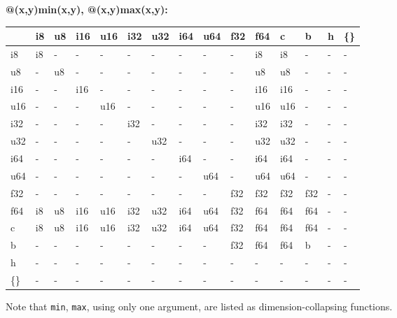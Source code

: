 \textbf{@(x,y)min(x,y), @(x,y)max(x,y):}
\begin{scriptsize}\begin{tt}\begin{center}\vspace{-.3cm}\begin{tabular}{|m{.65cm}||m{.65cm}|m{.65cm}|m{.65cm}|m{.65cm}|m{.65cm}|m{.65cm}|m{.65cm}|m{.65cm}|m{.65cm}|m{.65cm}|m{.65cm}|m{.65cm}|m{.65cm}|m{.65cm}|}\hline 
&i8&u8&i16&u16&i32&u32&i64&u64&f32&f64&c&b&h&\{\}\\ \hline \hline
i8&i8&-&-&-&-&-&-&-&-&i8&i8&-&-&-\\ \hline
u8&-&u8&-&-&-&-&-&-&-&u8&u8&-&-&-\\ \hline
i16&-&-&i16&-&-&-&-&-&-&i16&i16&-&-&-\\ \hline
u16&-&-&-&u16&-&-&-&-&-&u16&u16&-&-&-\\ \hline
i32&-&-&-&-&i32&-&-&-&-&i32&i32&-&-&-\\ \hline
u32&-&-&-&-&-&u32&-&-&-&u32&u32&-&-&-\\ \hline
i64&-&-&-&-&-&-&i64&-&-&i64&i64&-&-&-\\ \hline
u64&-&-&-&-&-&-&-&u64&-&u64&u64&-&-&-\\ \hline
f32&-&-&-&-&-&-&-&-&f32&f32&f32&f32&-&-\\ \hline
f64&i8&u8&i16&u16&i32&u32&i64&u64&f32&f64&f64&f64&-&-\\ \hline
c&i8&u8&i16&u16&i32&u32&i64&u64&f32&f64&f64&f64&-&-\\ \hline
b&-&-&-&-&-&-&-&-&f32&f64&f64&b&-&-\\ \hline
h&-&-&-&-&-&-&-&-&-&-&-&-&-&-\\ \hline
\{\}&-&-&-&-&-&-&-&-&-&-&-&-&-&-\\ \hline
\end{tabular}\end{center}\end{tt}\end{scriptsize} 
Note that {\tt min}, {\tt max}, using only one argument, are listed as dimension-collapsing functions.




